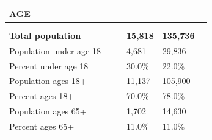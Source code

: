 \documentclass[9pt]{report}
\begin{document}
\vspace{24pt}
\setlength{\tabcolsep}{.01in} %
\begin{tabular}{p{.10in}p{.10in}p{.10in}p{3.7in}>{\hfill}p{.85in}>{\hfill}p{.85in}>{\hfill}p{.85in}>{\hfill}p{.85in}p{0.1in}}
\multicolumn{9}{l}{\parbox{7.1in}{\raggedright{\large{\strut\textbf{AGE}\strut}}}} \\ 
\hline
\multicolumn{4}{l}{\parbox{3.5in}{\raggedright{\textbf{}}}} & \multicolumn{1}{r}{\parbox{.85in}{\strut\raggedleft{\textbf{}\strut}}} & \multicolumn{1}{r}{\parbox{.85in}{\strut\raggedleft{\textbf{}\strut}}} & \multicolumn{1}{r}{\parbox{.85in}{\strut{}}} & \multicolumn{1}{r}{\parbox{.85in}{\strut{}}} & \\ 
\multicolumn{9}{l}{} \\ 
\multicolumn{4}{l}{\parbox{3.5in}{\strut\raggedright{\textbf{Total population}\strut}}} & \textbf{} & \textbf{} & \textbf{15,818} & \textbf{135,736} & \textbf{} \\ 
\multicolumn{4}{l}{\parbox{3.6in}{\strut\raggedright{{Population under age 18}}\strut}} &  &  & 4,681 & 29,836 & \multicolumn{1}{l}{}  \\ 
\multicolumn{4}{l}{\parbox{3.6in}{\strut\raggedright{{Percent under age 18}}\strut}} &  &  & 30.0\% & 22.0\% & \multicolumn{1}{l}{}  \\ 
\multicolumn{4}{l}{\parbox{3.6in}{\strut\raggedright{{Population ages 18+}}\strut}} &  &  & 11,137 & 105,900 & \multicolumn{1}{l}{}  \\ 
\multicolumn{4}{l}{\parbox{3.6in}{\strut\raggedright{{Percent ages 18+}}\strut}} &  &  & 70.0\% & 78.0\% & \multicolumn{1}{l}{}  \\ 
\multicolumn{4}{l}{\parbox{3.6in}{\strut\raggedright{{Population ages 65+}}\strut}} &  &  & 1,702 & 14,630 & \multicolumn{1}{l}{}  \\ 
\multicolumn{4}{l}{\parbox{3.6in}{\strut\raggedright{{Percent ages 65+}}\strut}} &  &  & 11.0\% & 11.0\% & \multicolumn{1}{l}{}  \\ 

\end{tabular}
\setlength{\tabcolsep}{6pt} %
\end{document}
